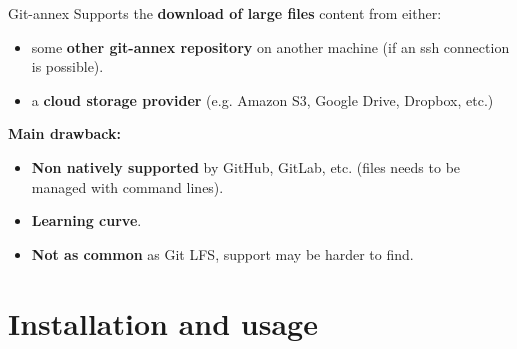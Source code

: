\begin{frame}{Git-annex}
  Supports the \textbf{download of large files} content from either:
  \begin{itemize}
    \item some \textbf{other git-annex repository} on another machine (if an ssh connection is possible).
    \item a \textbf{cloud storage provider} (e.g. Amazon S3, Google Drive, Dropbox, etc.)
  \end{itemize}
  \vspace{0.5cm}
  \textbf{Main drawback:}
  \begin{itemize}
    \item \textbf{Non natively supported} by GitHub, GitLab, etc. (files needs to be managed with command lines).
    \item \textbf{Learning curve}.
    \item \textbf{Not as common} as Git LFS, support may be harder to find.
  \end{itemize}
\end{frame}

\section{Installation and usage}

